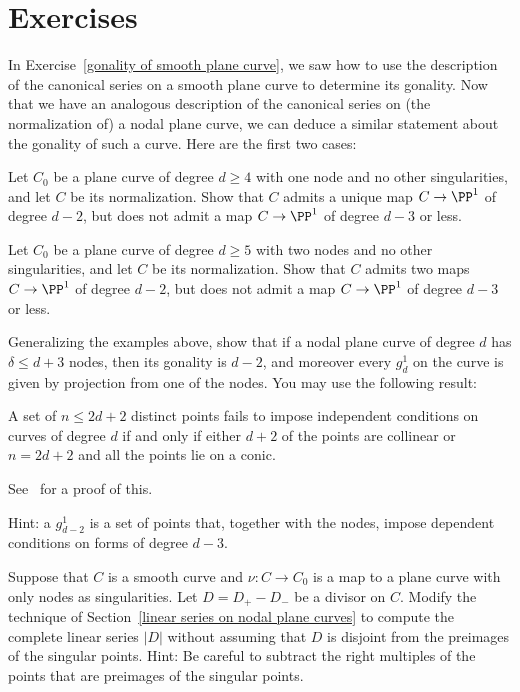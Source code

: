 \section{Exercises}

In Exercise~\ref{gonality of smooth plane curve}, we saw how to use the description of the canonical series on a smooth plane curve to determine its gonality. Now that we have an analogous description of the canonical series on (the normalization of) a nodal plane curve, we can deduce a similar statement about the gonality of such a curve. Here are the first two cases: 

\begin{exercise}
Let $C_0$ be a plane curve of degree $d\geq 4$ with one node and no other singularities, and let $C$ be its normalization. Show that $C$ admits a unique map $C \to \PP^1$ of degree $d-2$, but does not admit a map $C \to \PP^1$ of degree $d-3$ or less.
\end{exercise}

\begin{exercise}
Let $C_0$ be a plane curve of degree $d\geq 5$ with two nodes and no other singularities, and let $C$ be its normalization. Show that $C$ admits two maps $C \to \PP^1$ of degree $d-2$, but does not admit a map $C \to \PP^1$ of degree $d-3$ or less.
\end{exercise}

\begin{exercise}
Generalizing the examples above, show that if a nodal plane curve of degree $d$ has $\delta\leq d+3$ nodes,
then its gonality is $d-2$, and moreover every $g^1_d$ on the curve is given by projection from one of the nodes.
You may use the following result:
\begin{proposition}
 A set of $n \leq 2d+ 2$ distinct
points fails to impose independent conditions on curves of degree
$d$ if and only if either $d + 2$ of the points  are collinear or $n = 2d + 2$ and all the points lie
on a conic.
\end{proposition} 
See~\cite[p. 302]{MR1376653} for a proof of this.

Hint: a $g^1_{d-2}$ is a set of points that, together with the nodes, impose dependent conditions on forms of degree $d-3$.
\end{exercise}

\begin{exercise}\label{general case of divisors on nodal curves}
Suppose that $C$ is a smooth curve and $\nu: C \to C_0$ is a map to a plane curve with
only nodes as singularities. Let $D = D_{+}-D_{-}$ be a divisor on $C$. Modify the 
technique of Section~\ref{linear series on nodal plane curves} to compute the complete
linear series $|D|$ without assuming that $D$ is disjoint from the preimages of the singular
points. 
Hint: Be careful to subtract the right multiples of the points that are preimages of the singular
points.
\end{exercise}



